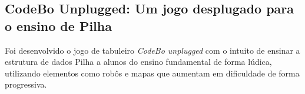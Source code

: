 \subsection{CodeBo Unplugged: Um jogo desplugado para o ensino de Pilha}

Foi desenvolvido o jogo de tabuleiro \textit{CodeBo unplugged} com o intuito de ensinar a estrutura de dados Pilha a alunos do ensino fundamental de forma lúdica, utilizando elementos como robôs e mapas que aumentam em dificuldade de forma progressiva. \cite{de2023codebo}


